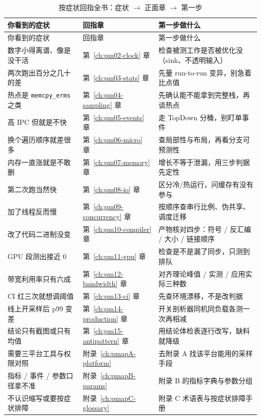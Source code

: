 \documentclass[12pt,a4paper,fontset=fandol]{ctexbook}
\newcommand{\Tp}[1]{\texttt{#1}}
\newcommand{\Mx}[1]{\textsf{#1}}
\begin{document}
\begin{longtable}{@{}>{\raggedright\arraybackslash}p{}>{\raggedright\arraybackslash}p{}>{\raggedright\arraybackslash}p{}@{}}
\caption{按症状回指全书：症状 $\rightarrow$ 正面章 $\rightarrow$ 第一步}\label{tab:pm15-index}\\
\toprule
你看到的症状 & 回指章 & 第一步做什么 \\
\midrule
\endfirsthead
\toprule
你看到的症状 & 回指章 & 第一步做什么 \\
\midrule
\endhead
\bottomrule
\endfoot
数字小得离谱、像是没干活 & 第~\ref{ch:pm02-clock} 章 & 检查被测工作是否被优化没（sink、不透明输入） \\
两次跑出百分之几十的差 & 第~\ref{ch:pm03-stats} 章 & 先量 run-to-run 变异，别急着比点值 \\
热点是 \Tp{memcpy\_erms} 之类 & 第~\ref{ch:pm04-sampling} 章 & 先确认能不能拿到完整栈，再谈热点 \\
高 \Mx{IPC} 但就是不快 & 第~\ref{ch:pm05-events} 章 & 走 TopDown 分桶，别盯单事件 \\
换个遍历顺序就差很多 & 第~\ref{ch:pm06-micro} 章 & 查局部性与布局，再看分支可预测性 \\
内存一直涨就是不敢删 & 第~\ref{ch:pm07-memory} 章 & 增长不等于泄漏，用三步判据先定性 \\
第二次跑当然快 & 第~\ref{ch:pm08-io} 章 & 区分冷/热运行，问缓存有没有参与 \\
加了线程反而慢 & 第~\ref{ch:pm09-concurrency} 章 & 按顺序查串行比例、伪共享、调度迁移 \\
改了代码二进制没变 & 第~\ref{ch:pm10-compiler} 章 & 产物核对四步：符号 / 反汇编 / 大小 / 链接顺序 \\
GPU 段测出接近 $0$ & 第~\ref{ch:pm11-gpu} 章 & 检查是不是漏了同步，只测到排队 \\
带宽利用率只有六成 & 第~\ref{ch:pm12-bandwidth} 章 & 对齐理论峰值 / 实测 / 应用实际三种数 \\
CI 红三次就想调阈值 & 第~\ref{ch:pm13-ci} 章 & 先查环境漂移，不是改判据 \\
线上开采样后 \Mx{p99} 变差 & 第~\ref{ch:pm14-production} 章 & 开关剖析器同机同负载各测一次再相减 \\
结论只有截图或只有均值 & 第~\ref{ch:pm15-antipattern} 章 & 用结论体检表逐行改写，缺料就降级 \\
需要三平台工具与权限对照 & 附录~\ref{ch:pmapA-platform} & 去附录 A 找该平台能用的采样手段 \\
指标 / 事件 / 参数口径拿不准 & 附录~\ref{ch:pmapB-params} & 附录 B 的指标字典与参数分组 \\
不认识缩写或要按症状排障 & 附录~\ref{ch:pmapC-glossary} & 附录 C 术语表与按症状排障手册 \\
\end{longtable}
\end{document}
